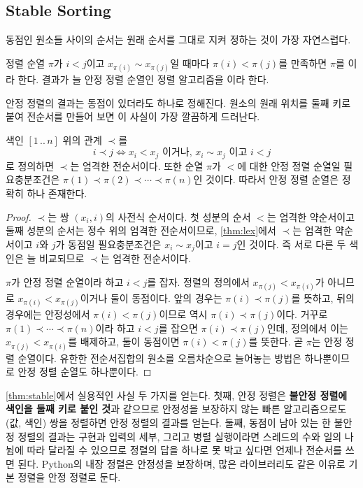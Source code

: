 \subsection{Stable Sorting}

동점인 원소들 사이의 순서는 원래 순서를 그대로 지켜 정하는 것이 가장 자연스럽다.

\begin{definition}[안정 정렬]
\label{def:stable}
정렬 순열 $\pi$가 $i<j$이고 $x_{\pi(i)}\sim x_{\pi(j)}$일 때마다 $\pi(i)<\pi(j)$를 만족하면 $\pi$를 이라 한다. 결과가 늘 안정 정렬 순열인 정렬 알고리즘을 이라 한다.
\end{definition}

안정 정렬의 결과는 동점이 있더라도 하나로 정해진다. 원소의 원래 위치를 둘째 키로 붙여 전순서를 만들어 보면 이 사실이 가장 깔끔하게 드러난다.

\begin{theorem}
\label{thm:stable}
색인 $[1\,..\,n]$ 위의 관계 $\prec$를
\[
i\prec j\iff x_i<x_j\text{ 이거나, }x_i\sim x_j\text{ 이고 }i<j
\]
로 정의하면 $\prec$는 엄격한 전순서이다. 또한 순열 $\pi$가 $<$에 대한 안정 정렬 순열일 필요충분조건은 $\pi(1)\prec\pi(2)\prec\cdots\prec\pi(n)$인 것이다. 따라서 안정 정렬 순열은 정확히 하나 존재한다.
\end{theorem}

\begin{proof}
$\prec$는 쌍 $(x_i,i)$의 사전식 순서이다. 첫 성분의 순서 $<$는 엄격한 약순서이고 둘째 성분의 순서는 정수 위의 엄격한 전순서이므로, \cref{thm:lex}에서 $\prec$는 엄격한 약순서이고 $i$와 $j$가 동점일 필요충분조건은 $x_i\sim x_j$이고 $i=j$인 것이다. 즉 서로 다른 두 색인은 늘 비교되므로 $\prec$는 엄격한 전순서이다.

$\pi$가 안정 정렬 순열이라 하고 $i<j$를 잡자. 정렬의 정의에서 $x_{\pi(j)}<x_{\pi(i)}$가 아니므로 $x_{\pi(i)}<x_{\pi(j)}$이거나 둘이 동점이다. 앞의 경우는 $\pi(i)\prec\pi(j)$를 뜻하고, 뒤의 경우에는 안정성에서 $\pi(i)<\pi(j)$이므로 역시 $\pi(i)\prec\pi(j)$이다. 거꾸로 $\pi(1)\prec\cdots\prec\pi(n)$이라 하고 $i<j$를 잡으면 $\pi(i)\prec\pi(j)$인데, 정의에서 이는 $x_{\pi(j)}<x_{\pi(i)}$를 배제하고, 둘이 동점이면 $\pi(i)<\pi(j)$를 뜻한다. 곧 $\pi$는 안정 정렬 순열이다. 유한한 전순서집합의 원소를 오름차순으로 늘어놓는 방법은 하나뿐이므로 안정 정렬 순열도 하나뿐이다.
\end{proof}

\cref{thm:stable}에서 실용적인 사실 두 가지를 얻는다. 첫째, 안정 정렬은 \textbf{불안정 정렬에 색인을 둘째 키로 붙인 것}과 같으므로 안정성을 보장하지 않는 빠른 알고리즘으로도 (값, 색인) 쌍을 정렬하면 안정 정렬의 결과를 얻는다. 둘째, 동점이 남아 있는 한 불안정 정렬의 결과는 구현과 입력의 세부, 그리고 병렬 실행이라면 스레드의 수와 일의 나뉨에 따라 달라질 수 있으므로 정렬의 답을 하나로 못 박고 싶다면 언제나 전순서를 쓰면 된다. Python의 내장 정렬은 안정성을 보장하며\cite{python-sorting-howto}, 많은 라이브러리도 같은 이유로 기본 정렬을 안정 정렬로 둔다.


